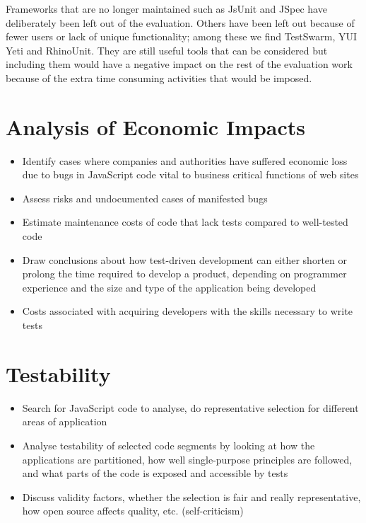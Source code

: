 \documentclass[11pt]{article}
\begin{document}
Frameworks that are no longer maintained such as JsUnit\cite{JsUnitGithub} and JSpec\cite{JSpec} have deliberately been left out of the evaluation. Others have been left out because of fewer users or lack of unique functionality; among these we find TestSwarm, YUI Yeti and RhinoUnit. They are still useful tools that can be considered but including them would have a negative impact on the rest of the evaluation work because of the extra time consuming activities that would be imposed.

\section{Analysis of Economic Impacts}

\begin{itemize}
  \item Identify cases where companies and authorities have suffered economic loss due to bugs in JavaScript code vital to business critical functions of web sites
  \item Assess risks and undocumented cases of manifested bugs
  \item Estimate maintenance costs of code that lack tests compared to well-tested code
  \item Draw conclusions about how test-driven development can either shorten or prolong the time required to develop a product, depending on programmer experience and the size and type of the application being developed
  \item Costs associated with acquiring developers with the skills necessary to write tests
\end{itemize}

\section{Testability}

\begin{itemize}
  \item Search for JavaScript code to analyse, do representative selection for different areas of application
  \item Analyse testability of selected code segments by looking at how the applications are partitioned, how well single-purpose principles are followed, and what parts of the code is exposed and accessible by tests
  \item Discuss validity factors, whether the selection is fair and really representative, how open source affects quality, etc. (self-criticism)
\end{itemize}
\end{document}
